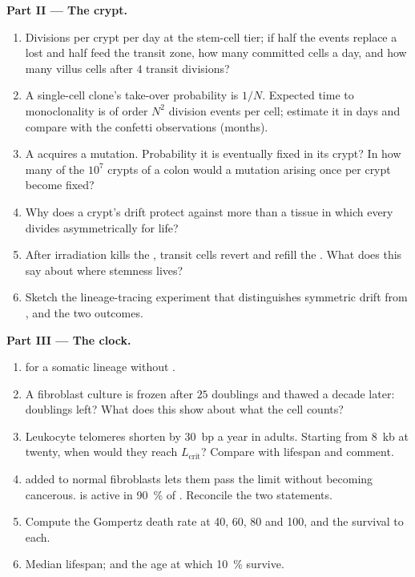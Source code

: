 \begin{problem}
\medskip
\noindent\textbf{Part II --- The crypt.}
\begin{enumerate}[resume]
  \item Divisions per crypt per day at the stem-cell tier; if half the
        events replace a lost  and half feed the transit zone,
        how many committed cells a day, and how many villus cells after
        $4$ transit divisions?
  \item A single-cell clone's take-over probability is $1/N$. Expected
        time to monoclonality is of order $N^{2}$ division events per
        cell; estimate it in days and compare with the confetti
        observations (months).
  \item A  acquires a mutation. Probability it is eventually
        fixed in its crypt? In how many of the $10^{7}$ crypts of a
        colon would a mutation arising once per crypt become fixed?
  \item Why does a crypt's drift protect against  more than a
        tissue in which every  divides asymmetrically for life?
  \item After irradiation kills the , transit cells revert
        and refill the . What does this say about where stemness
        lives?
  \item Sketch the lineage-tracing experiment that distinguishes
        symmetric drift from , and the two outcomes.
\end{enumerate}

\medskip
\noindent\textbf{Part III --- The clock.}
\begin{enumerate}[resume]
  \item {} for a somatic lineage without .
  \item A fibroblast culture is frozen after $25$ doublings and thawed
        a decade later: doublings left? What does this show about what
        the cell counts?
  \item Leukocyte telomeres shorten by \qty{30}{bp} a year in adults.
        Starting from \qty{8}{kb} at twenty, when would they reach
        $L_{\text{crit}}$? Compare with lifespan and comment.
  \item {} added to normal fibroblasts lets them pass the limit
        without becoming cancerous.  is active in \qty{90}{\%}
        of . Reconcile the two statements.
  \item Compute the Gompertz death rate at 40, 60, 80 and 100, and the
        survival to each.
  \item Median lifespan; and the age at which \qty{10}{\%} survive.
\end{enumerate}


\end{problem}
